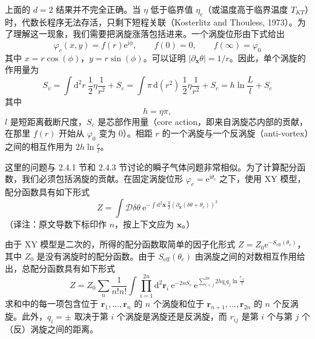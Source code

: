 上面的 $d=2$ 结果并不完全正确。当 $\eta$ 低于临界值 $\eta_{c}$（或温度高于临界温度 $T_{KT}$）时，代数长程序无法存活，只剩下短程关联（Kosterlitz and Thouless, 1973）。为了理解这一现象，我们需要把涡旋涨落包括进来。一个涡旋位形由下式给出
\begin{equation*}
\varphi_{c}(x,y) = f(r)\mathrm{e}^{\mathrm{i}\phi}, \qquad f(0)=0, \qquad f(\infty)=\varphi_{0}
\end{equation*}
其中 $x = r\cos(\phi)$，$y = r\sin(\phi)$。可以证明 $|\partial_{\pmb{x}}\theta| = 1/r$。因此，单个涡旋的作用量为
\begin{equation*}
S_{v} = \int \mathrm{d}^{2}r\ \frac{1}{2}\eta\frac{1}{r^{2}} + S_{c}
= \int \pi\,\mathrm{d}(r^{2})\ \frac{1}{2}\eta\frac{1}{r^{2}} + S_{c}
= h\ln\frac{L}{l} + S_{c}
\end{equation*}
其中
\begin{equation*}
h = \eta\pi,
\end{equation*}
$l$ 是短距离截断尺度，$S_{c}$ 是芯部作用量（core action，即来自涡旋芯内部的贡献，在那里 $f(r)$ 开始从 $\varphi_{0}$ 变为 0）。相距 $r$ 的一个涡旋与一个反涡旋（anti-vortex）之间的相互作用为 $2h\ln\frac{r}{l}$。

这里的问题与 2.4.1 节和 2.4.3 节讨论的瞬子气体问题非常相似。为了计算配分函数，我们必须包括涡旋的贡献。在固定涡旋位形 $\varphi_{c} = \mathrm{e}^{\mathrm{i}\theta_{c}}$ 之下，使用 XY 模型，配分函数具有如下形式
\begin{equation*}
Z = \int \mathcal{D}\delta\theta\ \mathrm{e}^{-\int \mathrm{d}^{2}\pmb{x}\ \frac{\eta}{2}\left(\partial_{\pmb{x}}(\delta\theta+\theta_{c})\right)^{2}}
\end{equation*}
（译注：原文导数下标印作 $n$，按上下文应为 $\pmb{x}$。）

由于 XY 模型是二次的，所得的配分函数取简单的因子化形式 $Z = Z_{0}\mathrm{e}^{-S_{\mathrm{eff}}(\theta_{c})}$，其中 $Z_{0}$ 是没有涡旋时的配分函数。由于 $S_{\mathrm{eff}}(\theta_{c})$ 由涡旋之间的对数相互作用给出，总配分函数具有如下形式
\begin{equation*}
Z = Z_{0} \sum_{n} \frac{1}{n!n!} \int \prod_{i=1}^{2n} \mathrm{d}^{2}\pmb{r}_{i}\ \mathrm{e}^{-2nS_{c}}\ \mathrm{e}^{\sum_{i<j}^{2n} 2hq_{i}q_{j}\ln\frac{r_{ij}}{l}}
\tag{3.4.5}
\end{equation*}
求和中的每一项包含位于 $\pmb{r}_{1},\ldots,\pmb{r}_{n}$ 的 $n$ 个涡旋和位于 $\pmb{r}_{n+1},\ldots,\pmb{r}_{2n}$ 的 $n$ 个反涡旋。此外，$q_{i} = \pm$ 取决于第 $i$ 个涡旋是涡旋还是反涡旋，而 $r_{ij}$ 是第 $i$ 个与第 $j$ 个（反）涡旋之间的距离。

